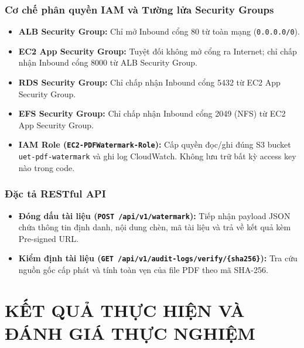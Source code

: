 \documentclass[12pt,a4paper]{report}
\begin{document}
\subsection{Cơ chế phân quyền IAM và Tường lửa Security Groups}
\begin{itemize}
    \item \textbf{ALB Security Group:} Chỉ mở Inbound cổng 80 từ toàn mạng (\texttt{0.0.0.0/0}).
    \item \textbf{EC2 App Security Group:} Tuyệt đối không mở cổng ra Internet; chỉ chấp nhận Inbound cổng 8000 từ ALB Security Group.
    \item \textbf{RDS Security Group:} Chỉ chấp nhận Inbound cổng 5432 từ EC2 App Security Group.
    \item \textbf{EFS Security Group:} Chỉ chấp nhận Inbound cổng 2049 (NFS) từ EC2 App Security Group.
    \item \textbf{IAM Role (\texttt{EC2-PDFWatermark-Role}):} Cấp quyền đọc/ghi đúng S3 bucket \texttt{uet-pdf-watermark} và ghi log CloudWatch. Không lưu trữ bất kỳ access key nào trong code.
\end{itemize}

\subsection{Đặc tả RESTful API}
\begin{itemize}
    \item \textbf{Đóng dấu tài liệu (\texttt{POST /api/v1/watermark}):} Tiếp nhận payload JSON chứa thông tin định danh, nội dung chèn, mã tài liệu và trả về kết quả kèm Pre-signed URL.
    \item \textbf{Kiểm định tài liệu (\texttt{GET /api/v1/audit-logs/verify/\{sha256\}}):} Tra cứu nguồn gốc cấp phát và tính toàn vẹn của file PDF theo mã SHA-256.
\end{itemize}

\chapter{KẾT QUẢ THỰC HIỆN VÀ ĐÁNH GIÁ THỰC NGHIỆM}
\end{document}
